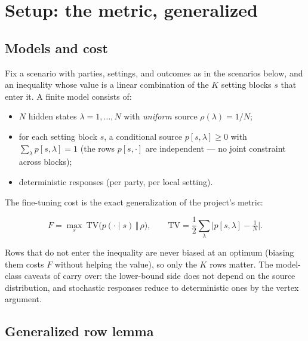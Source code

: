 \documentclass[aps,pra,reprint,superscriptaddress,floatfix]{revtex4-2}
\newcommand{\TV}{\mathrm{TV}}
\begin{document}
\section{Setup: the metric, generalized}
\label{sec:setup}

\subsection{Models and cost}

Fix a scenario with parties, settings, and outcomes as in the scenarios
below, and an inequality whose value is a linear combination of the
$K$ setting blocks $s$ that enter it. A finite model consists of:

\begin{itemize}
\item $N$ hidden states $\lambda=1,\dots,N$ with \emph{uniform} source
  $\rho(\lambda)=1/N$;
\item for each setting block $s$, a conditional source $p[s,\lambda]\ge 0$
  with $\sum_{\lambda}p[s,\lambda]=1$ (the rows $p[s,\cdot]$ are
  independent --- no joint constraint across blocks);
\item deterministic responses (per party, per local setting).
\end{itemize}

The fine-tuning cost is the exact generalization of the project's metric:

\begin{equation}
F=\max_{s}\ \TV\big(p(\cdot\mid s)\,\Vert\,\rho\big),\qquad
\TV=\frac12\sum_{\lambda}\big|p[s,\lambda]-\tfrac1N\big|.
\label{eq:Fgen}
\end{equation}

Rows that do not enter the inequality are never biased at an optimum
(biasing them costs $F$ without helping the value), so only the $K$ rows
matter. The model-class caveats of \cite{mainpaper2026} carry over: the
lower-bound side does not depend on the source distribution, and
stochastic responses reduce to deterministic ones by the vertex argument.

\subsection{Generalized row lemma}
\end{document}
